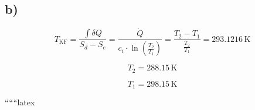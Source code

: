 

\subsection*{b)}

\[
T_{\text{KF}} = \frac{\int \delta Q}{S_d - S_e} = \frac{\dot{Q}}{c_{i} \cdot \ln \left( \frac{T_2}{T_1} \right)} = \frac{T_2 - T_1}{\frac{T_2}{T_1}} = 293.1216 \, \text{K}
\]

\[
T_2 = 288.15 \, \text{K}
\]

\[
T_1 = 298.15 \, \text{K}
\]

``````latex